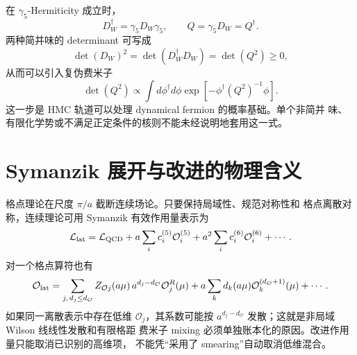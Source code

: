 \documentclass[UTF8,11pt,oneside]{ctexbook}
\begin{document}
在 \(\gamma_5\)-Hermiticity 成立时，
\begin{equation}
 D_W^\dagger=\gamma_5D_W\gamma_5,
 \qquad Q=\gamma_5D_W=Q^\dagger .
 \label{eq:deep-gamma5-hermiticity}
\end{equation}
两种简并味的 determinant 可写成
\begin{equation}
 \det(D_W)^2=\det(D_W^\dagger D_W)=\det(Q^2)\ge0,
 \label{eq:deep-det-positivity}
\end{equation}
从而可以引入复伪费米子
\begin{equation}
 \det(Q^2)\propto\int d\phi^\dagger d\phi
 \exp[-\phi^\dagger(Q^2)^{-1}\phi].
 \label{eq:deep-pseudofermion}
\end{equation}
这一步是 HMC 轨道可以处理 dynamical fermion 的概率基础。单个非简并
味、有限化学势或不满足正定条件的核则不能未经说明地套用这一式。

\section{Symanzik 展开与改进的物理含义}

格点理论在尺度 \(\pi/a\) 截断连续场论。只要保持局域性、规范对称性和
格点离散对称，连续理论可用 Symanzik 有效作用量表示为
\begin{equation}
 \mathcal L_{\rm lat}
 =\mathcal L_{\rm QCD}
 +a\sum_i c_i^{(5)}\mathcal O_i^{(5)}
 +a^2\sum_i c_i^{(6)}\mathcal O_i^{(6)}+\cdots .
 \label{eq:deep-symanzik-action}
\end{equation}
对一个格点算符也有
\begin{equation}
 \mathcal O_{\rm lat}
 =\sum_{j,\,d_j\le d_\mathcal O}
 Z_{\mathcal O j}(a\mu)\,a^{d_j-d_\mathcal O}\mathcal O_j^R(\mu)
 +a\sum_k d_k(a\mu)\mathcal O_k^{(d_\mathcal O+1)}(\mu)+\cdots .
 \label{eq:deep-symanzik-operator}
\end{equation}
如果同一离散表示中存在低维 \(\mathcal O_j\)，其系数可能按
\(a^{d_j-d_\mathcal O}\) 发散；这就是非局域 Wilson 线线性发散和有限格距
费米子 mixing 必须单独账本化的原因。改进作用量只能取消已识别的高维项，
不能凭“采用了 smearing”自动取消低维混合。
\end{document}
